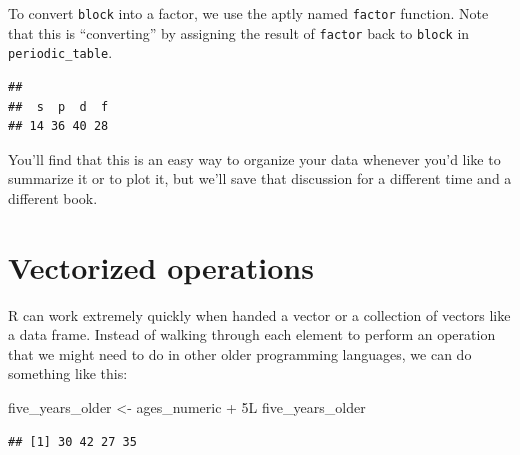 \documentclass[]{tufte-book}
\newenvironment{Shaded}{\begin{snugshade}}{\end{snugshade}}
\newcommand{\KeywordTok}[1]{\textcolor[rgb]{0.13,0.29,0.53}{\textbf{{#1}}}}
\newcommand{\DataTypeTok}[1]{\textcolor[rgb]{0.13,0.29,0.53}{{#1}}}
\newcommand{\StringTok}[1]{\textcolor[rgb]{0.31,0.60,0.02}{{#1}}}
\newcommand{\NormalTok}[1]{{#1}}
\theoremstyle{definition}
\theoremstyle{definition}
\theoremstyle{remark}
\begin{document}
To convert \texttt{block} into a factor, we use the aptly named
\texttt{factor} function. Note that this is ``converting'' by assigning
the result of \texttt{factor} back to \texttt{block} in
\texttt{periodic\_table}.

\begin{Shaded}
\end{Shaded}

\begin{Shaded}
\end{Shaded}

\begin{verbatim}
## 
##  s  p  d  f 
## 14 36 40 28
\end{verbatim}

You'll find that this is an easy way to organize your data whenever
you'd like to summarize it or to plot it, but we'll save that discussion
for a different time and a different book.

\section{Vectorized operations}\label{vectorized-operations}

R can work extremely quickly when handed a vector or a collection of
vectors like a data frame. Instead of walking through each element to
perform an operation that we might need to do in other older programming
languages, we can do something like this:

\begin{Shaded}
\begin{Highlighting}[]
\NormalTok{five_years_older <-}\StringTok{ }\NormalTok{ages_numeric +}\StringTok{ }\NormalTok{5L}
\NormalTok{five_years_older}
\end{Highlighting}
\end{Shaded}

\begin{verbatim}
## [1] 30 42 27 35
\end{verbatim}
\end{document}
